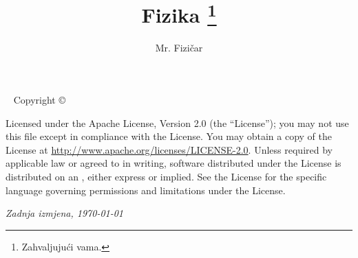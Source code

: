 \documentclass{tufte-book}
\title{Fizika  \thanks{Zahvaljujući vama.}}
\author[Google]{Mr. Fizičar}
\newcommand{\openepigraph}[2]{%
	\begin{fullwidth}
		\sffamily\large
		\begin{doublespace}
			\noindent\allcaps{#1}\\%
			\noindent\allcaps{#2}%
		\end{doublespace}
	\end{fullwidth}
}
\newcommand{\blankpage}{\newpage\hbox{}\thispagestyle{empty}\newpage}
\begin{document}
	
	\frontmatter
	
	
	
	
	\maketitle
	
	
	\newpage
	\begin{fullwidth}
		~\vfill
		\thispagestyle{empty}
		\setlength{\parindent}{0pt}
		\setlength{\parskip}{\baselineskip}
		Copyright \copyright\ \the\year\ \thanklessauthor
		
		\par{}
		
		\par{}
		
		\par Licensed under the Apache License, Version 2.0 (the ``License''); you may not
		use this file except in compliance with the License. You may obtain a copy
		of the License at \url{http://www.apache.org/licenses/LICENSE-2.0}. Unless
		required by applicable law or agreed to in writing, software distributed
		under the License is distributed on an , either express or implied. See the
		License for the specific language governing permissions and limitations
		under the License.
		
		\par\textit{Zadnja izmjena, \monthdayyeardate\today}
	\end{fullwidth}
\end{document}
